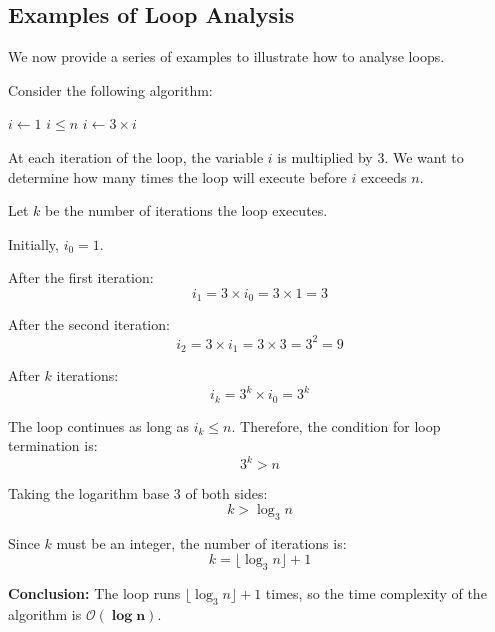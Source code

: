 \subsection*{Examples of Loop Analysis}
We now provide a series of examples to illustrate how to analyse loops.

\begin{example}

    Consider the following algorithm:
    
    \begin{codebox}
        \li $i \gets 1$
        \li \While $i \leq n$ \Do
        \li     $i \gets 3 \times i$
            \End
    \end{codebox}
    
    At each iteration of the \texttt{\While} loop, the variable $i$ is multiplied by $3$. We want to determine how many times the loop will execute before $i$ exceeds $n$.
    
    Let $k$ be the number of iterations the loop executes.
    
    Initially, $i_0 = 1$.
    
    After the first iteration:
    \[ i_1 = 3 \times i_0 = 3 \times 1 = 3 \]
    
    After the second iteration:
    \[ i_2 = 3 \times i_1 = 3 \times 3 = 3^2 = 9 \]
    
    After $k$ iterations:
    \[ i_k = 3^k \times i_0 = 3^k \]
    
    The loop continues as long as $i_k \leq n$. Therefore, the condition for loop termination is:
    \[ 3^k > n \]
    
    Taking the logarithm base $3$ of both sides:
    \[ k > \log_3 n \]
    
    Since $k$ must be an integer, the number of iterations is:
    \[ k = \lfloor \log_3 n \rfloor + 1 \]
    
    \textbf{Conclusion:} The loop runs $\lfloor \log_3 n \rfloor + 1$ times, so the time complexity of the algorithm is $\boldsymbol{\mathcal{O}(\log n)}$.
    
\end{example}
    
